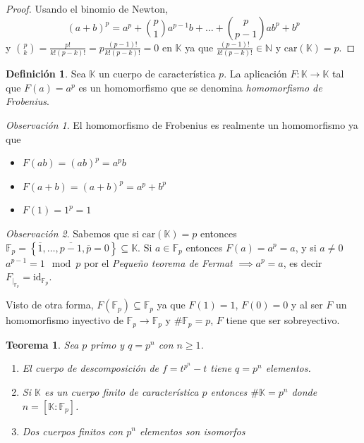 \documentclass[10pt, spanish]{report}
\newtheorem{tma}{Teorema}[chapter]
\theoremstyle{definition}
\newtheorem*{defin}{Definición}
\theoremstyle{custom}
\theoremstyle{remark}
\newtheorem*{obs}{Observación}
\newcommand{\N}{\mathbb{N}}
\newcommand{\F}{\mathbb{F}}
\newcommand{\K}{\mathbb{K}}
\newcommand{\id}{\text{id}}
\newcommand{\car}[1]{\text{car}(#1)}
\renewcommand{\geq}{\geqslant}
\newcommand{\fecha}[1]{\marginpar{\underline{\footnotesize{#1}}}}
\begin{document}
\begin{proof}
    Usando el binomio de Newton,
    \[(a+b)^p=a^p+\binom{p}{1}a^{p-1}b+\ldots+\binom{p}{p-1}ab^p+b^p\] y
    $\binom{p}{k}=\frac{p!}{k!(p-k)!}=p \frac{(p-1)!}{k!(p-k)!}=0$ en $\K$ ya
    que $\frac{(p-1)!}{k!(p-k)!}\in\N$ y $\car{\K}=p$.
\end{proof}

\begin{defin}
    Sea $\K$ un cuerpo de característica $p$. La aplicación $F:\K\to\K$ tal
    que $F(a)=a^p$ es un homomorfismo que se denomina \textit{homomorfismo de
    Frobenius}.
\end{defin}

\begin{obs}
    El homomorfismo de Frobenius es realmente un homomorfismo ya que
    \begin{itemize}
        \item $F(ab)=(ab)^p=a^pb$
        \item $F(a+b)=(a+b)^p=a^p+b^p$
        \item $F(1)=1^p=1$
    \end{itemize}
\end{obs}

\fecha{15/03}
\begin{obs}
    Sabemos que si $\car{\K}=p$ entonces $\F_p=\left\{
    \overline{1},\ldots,\overline{p-1},\overline{p}=0\right\}\subseteq\K$. Si
    $a\in\F_p$ entonces $F(a)=a^p=a$, y si $a\neq0$ $a^{p-1}=1\mod p$ por el
    \textit{Pequeño teorema de Fermat} $\implies a^p=a$, es decir $F_{|_{\F_p}}=
    \id_{\F_p}$.

    Visto de otra forma, $F(\F_p)\subseteq\F_p$ ya que $F(1)=1$, $F(0)=0$ y al
    ser $F$ un homomorfismo inyectivo de $\F_p\to\F_p$ y $\#\F_p=p$, $F$ tiene
    que ser sobreyectivo.
\end{obs}

\begin{tma}
    Sea $p$ primo y $q=p^n$ con $n\geq1$.
    \begin{enumerate}
        \item El cuerpo de descomposición de $f=t^{p^n}-t$ tiene $q=p^n$
            elementos.
        \item  Si $\K$ es un cuerpo finito de característica $p$ entonces
            $\#\K=p^n$ donde $n=\left[ \K:\F_p \right]$.
        \item Dos cuerpos finitos con $p^n$ elementos son isomorfos
    \end{enumerate}
\end{tma}
\end{document}
